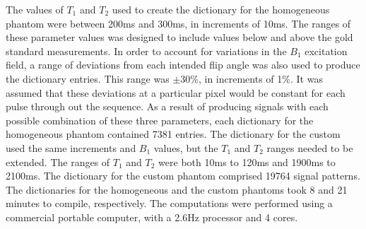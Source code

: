 \documentclass[journal]{IEEEtran}
\begin{document}
The values of $T_1$ and $T_2$ used to create the dictionary for the homogeneous phantom were between 200ms and 300ms, in increments of 10ms. The ranges of these parameter values was designed to include values below and above the gold standard measurements. In order to account for variations in the $B_1$ excitation field, a range of deviations from each intended flip angle was also used to produce the dictionary entries. This range was $\pm$30\%, in increments of 1\%. It was assumed that these deviations at a particular pixel would be constant for each pulse through out the sequence.  As a result of producing signals with each possible combination of these three parameters, each dictionary for the homogeneous phantom contained 7381 entries. The dictionary for the custom used the same increments and $B_1$ values, but the $T_1$ and $T_2$ ranges needed to be extended. The ranges of $T_1$ and $T_2$ were both 10ms to 120ms and 1900ms to 2100ms. The dictionary for the custom phantom comprised 19764 signal patterns.
The dictionaries for the homogeneous and the custom phantoms took 8 and 21 minutes to compile, respectively. The computations were performed using a commercial portable computer, with a 2.6Hz processor and 4 cores.
\end{document}
